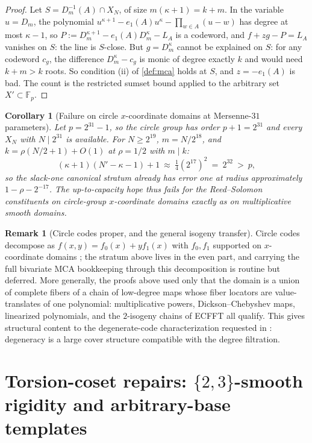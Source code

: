 \documentclass[11pt]{article}
\newtheorem{corollary}[corollary]{Corollary}
\theoremstyle{definition}
\newtheorem{remark}[remark]{Remark}
\newcommand{\F}{\mathbb F}
\begin{document}
\begin{proof}
Let $S=D_m^{-1}(A)\cap X_N$, of size $m(\kappa+1)=k+m$.  In the variable $u=D_m$, the polynomial $u^{\kappa+1}-e_1(A)u^{\kappa}-\prod_{w\in A}(u-w)$ has degree at most $\kappa-1$, so $P:=D_m^{\kappa+1}-e_1(A)D_m^{\kappa}-L_A$ is a codeword, and $f+zg-P=L_A$ vanishes on $S$: the line is $S$-close.  But $g=D_m^\kappa$ cannot be explained on $S$: for any codeword $c_g$, the difference $D_m^\kappa-c_g$ is monic of degree exactly $k$ and would need $k+m>k$ roots.  So condition (ii) of \cref{def:mca} holds at $S$, and $z=-e_1(A)$ is bad.  The count is the restricted sumset bound applied to the arbitrary set $X'\subset\F_p$.
\end{proof}

\begin{corollary}[Failure on circle $x$-coordinate domains at Mersenne-$31$ parameters]\label{cor:circle}
Let $p=2^{31}-1$, so the circle group has order $p+1=2^{31}$ and every $X_N$ with $N\mid 2^{31}$ is available.  For $N\ge2^{19}$, $m=N/2^{18}$, and $k=\rho(N/2+1)+O(1)$ at $\rho=1/2$ with $m\mid k$:
\[
        (\kappa+1)(N'-\kappa-1)+1\ \approx\ \tfrac14(2^{17})^2\ =\ 2^{32}\ >\ p,
\]
so the slack-one canonical stratum already has error one at radius approximately $1-\rho-2^{-17}$.  The up-to-capacity hope thus fails for the Reed--Solomon constituents on circle-group $x$-coordinate domains exactly as on multiplicative smooth domains.
\end{corollary}

\begin{remark}[Circle codes proper, and the general isogeny transfer]\label{rem:isogeny}
Circle codes decompose as $f(x,y)=f_0(x)+yf_1(x)$ with $f_0,f_1$ supported on $x$-coordinate domains \cite{HLP24}; the stratum above lives in the even part, and carrying the full bivariate MCA bookkeeping through this decomposition is routine but deferred.  More generally, the proofs above used only that the domain is a union of complete fibers of a chain of low-degree maps whose fiber locators are value-translates of one polynomial: multiplicative powers, Dickson--Chebyshev maps, linearized polynomials, and the $2$-isogeny chains of ECFFT \cite{ECFFT} all qualify.  This gives structural content to the degenerate-code characterization requested in \cite{ABF26}: degeneracy is a large cover structure compatible with the degree filtration.
\end{remark}

\section{Torsion-coset repairs: \texorpdfstring{$\{2,3\}$}{(2,3)}-smooth rigidity and arbitrary-base templates}\label{sec:torsion}
\end{document}
